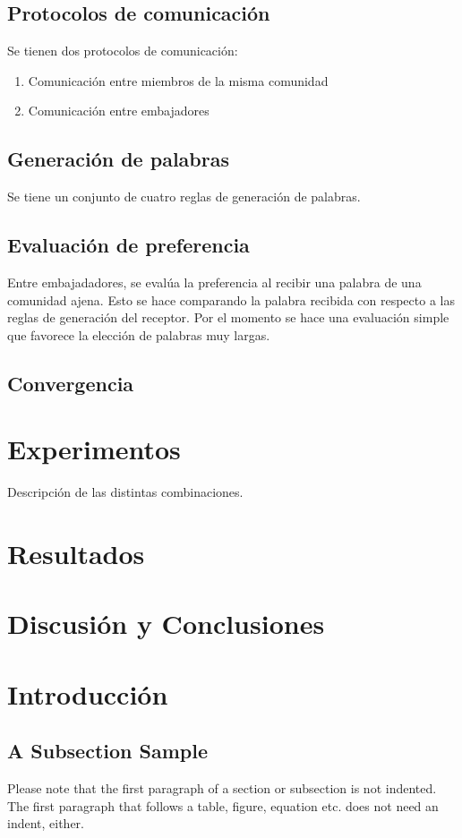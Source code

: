 \documentclass[runningheads]{llncs}
\begin{document}
\subsection{Protocolos de comunicación}

Se tienen dos protocolos de comunicación:

\begin{enumerate}
	\item Comunicación entre miembros de la misma comunidad
	\item Comunicación entre embajadores
\end{enumerate}


\subsection{Generación de palabras}


Se tiene un conjunto de cuatro reglas de generación de palabras. 


\subsection{Evaluación de preferencia}

Entre embajadadores, se evalúa la preferencia al recibir una palabra de una comunidad ajena. Esto se hace comparando la palabra recibida con respecto a las reglas de generación del receptor. Por el momento se hace una evaluación simple que favorece la elección de palabras muy largas.
\subsection{Convergencia}


\section{Experimentos}


Descripción de las distintas combinaciones.
\section{Resultados}
\section{Discusión y Conclusiones}
\section{Introducción}
\subsection{A Subsection Sample}Please note that the first paragraph of a section or subsection is
not indented. The first paragraph that follows a table, figure,
equation etc. does not need an indent, either.
\end{document}
